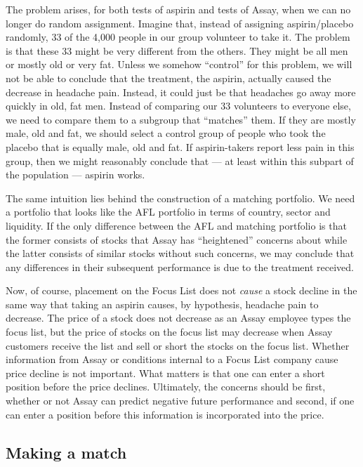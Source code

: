 \documentclass{article}
\begin{document}
The problem arises, for both tests of aspirin and tests of Assay, when
we can no longer do random assignment. Imagine that, instead of
assigning aspirin/placebo randomly, 33 of the 4,000 people in our
group volunteer to take it. The problem is that these 33 might be very
different from the others. They might be all men or mostly old or very
fat. Unless we somehow ``control'' for this problem, we will not be
able to conclude that the treatment, the aspirin, actually caused the
decrease in headache pain. Instead, it could just be that headaches go
away more quickly in old, fat men. Instead of comparing our 33
volunteers to everyone else, we need to compare them to a subgroup
that ``matches'' them. If they are mostly male, old and fat, we should
select a control group of people who took the placebo that is equally
male, old and fat. If aspirin-takers report less pain in this group,
then we might reasonably conclude that --- at least within this
subpart of the population --- aspirin works.

The same intuition lies behind the construction of a matching
portfolio. We need a portfolio that looks like the AFL portfolio in
terms of country, sector and liquidity. If the only difference between
the AFL and matching portfolio is that the former consists of stocks
that Assay has ``heightened'' concerns about while the latter consists
of similar stocks without such concerns, we may conclude that any
differences in their subsequent performance is due to the treatment
received. 

Now, of course, placement on the Focus List does not \emph{cause} a
stock decline in the same way that taking an aspirin causes, by
hypothesis, headache pain to decrease.  The price of a stock does not
decrease as an Assay employee types the focus list, but the price of
stocks on the focus list may decrease when Assay customers receive the
list and sell or short the stocks on the focus list.  Whether
information from Assay or conditions internal to a Focus List company
cause price decline is not important.  What matters is that one can
enter a short position before the price declines.  Ultimately, the
concerns should be first, whether or not Assay can predict negative
future performance and second, if one can enter a position before this
information is incorporated into the price.


\subsection{Making a match}
\end{document}
